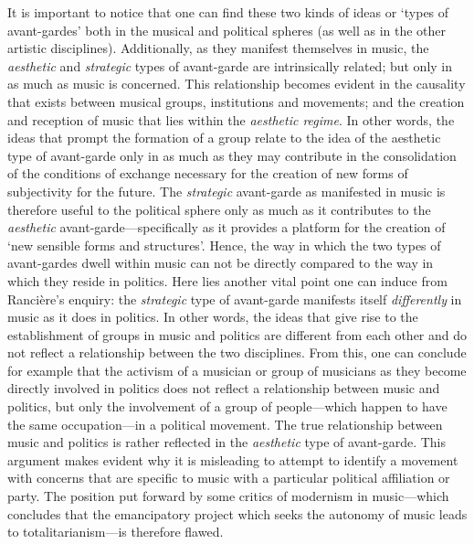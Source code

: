 It is important to notice that one can find these two kinds of ideas or `types of avant-gardes' both in the musical and political spheres (as well as in the other artistic disciplines). Additionally, as they manifest themselves in music, the \emph{aesthetic} and \emph{strategic} types of avant-garde are intrinsically related; but only in as much as music is concerned.  This relationship becomes evident in the causality that exists between musical groups, institutions and movements; and the creation and reception of music that lies within the \emph{aesthetic regime}. In other words, the ideas that prompt the formation of a group relate to the idea of the aesthetic type of avant-garde only in as much as they may contribute in the consolidation of the conditions of exchange necessary for the creation of new forms of subjectivity for the future. The \emph{strategic} avant-garde as manifested in music is therefore useful to the political sphere only as much as it contributes to the \emph{aesthetic} avant-garde---specifically as it provides a platform for the creation of `new sensible forms and structures'. Hence, the way in which the two types of avant-gardes dwell within music can not be directly compared to the way in which they reside in politics. Here lies another vital point one can induce from Ranci\`{e}re's enquiry: the \emph{strategic} type of avant-garde manifests itself \emph{differently} in music as it does in politics. In other words, the ideas that give rise to the establishment of groups in music and politics are different from each other and do not reflect a relationship between the two disciplines. From this, one can conclude for example that the activism of a musician or group of musicians as they become directly involved in politics does not reflect a relationship between music and politics, but only the involvement of a group of people---which happen to have the same occupation---in a political movement. The true relationship between music and politics is rather reflected in the \emph{aesthetic} type of avant-garde. This argument makes evident why it is misleading to attempt to identify a movement with concerns that are specific to music with a particular political affiliation or party. The position put forward by some critics of modernism in music---which concludes that the emancipatory project which seeks the autonomy of music leads to totalitarianism---is therefore flawed.  

